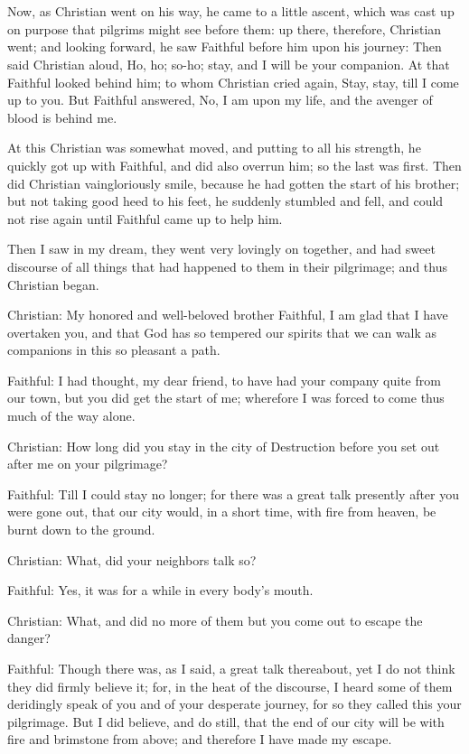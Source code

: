 \chapter[THE FIFTH STAGE]{}

Now, as Christian went on his way, he came to a little ascent, which was cast up on purpose that pilgrims might see before them: up there, therefore, Christian went; and looking forward, he saw Faithful before him upon his journey: Then said Christian aloud, Ho, ho; so-ho; stay, and I will be your companion. At that Faithful looked behind him; to whom Christian cried again, Stay, stay, till I come up to you. But Faithful answered, No, I am upon my life, and the avenger of blood is behind me.

At this Christian was somewhat moved, and putting to all his strength, he quickly got up with Faithful, and did also overrun him; so the last was first. Then did Christian vaingloriously smile, because he had gotten the start of his brother; but not taking good heed to his feet, he suddenly stumbled and fell, and could not rise again until Faithful came up to help him.

Then I saw in my dream, they went very lovingly on together, and had sweet discourse of all things that had happened to them in their pilgrimage; and thus Christian began.

Christian: My honored and well-beloved brother Faithful, I am glad that I have overtaken you, and that God has so tempered our spirits that we can walk as companions in this so pleasant a path.

Faithful: I had thought, my dear friend, to have had your company quite from our town, but you did get the start of me; wherefore I was forced to come thus much of the way alone.

Christian: How long did you stay in the city of Destruction before you set out after me on your pilgrimage?

Faithful: Till I could stay no longer; for there was a great talk presently after you were gone out, that our city would, in a short time, with fire from heaven, be burnt down to the ground.

Christian: What, did your neighbors talk so?

Faithful: Yes, it was for a while in every body's mouth.

Christian: What, and did no more of them but you come out to escape the danger?

Faithful: Though there was, as I said, a great talk thereabout, yet I do not think they did firmly believe it; for, in the heat of the discourse, I heard some of them deridingly speak of you and of your desperate journey, for so they called this your pilgrimage. But I did believe, and do still, that the end of our city will be with fire and brimstone from above; and therefore I have made my escape.

